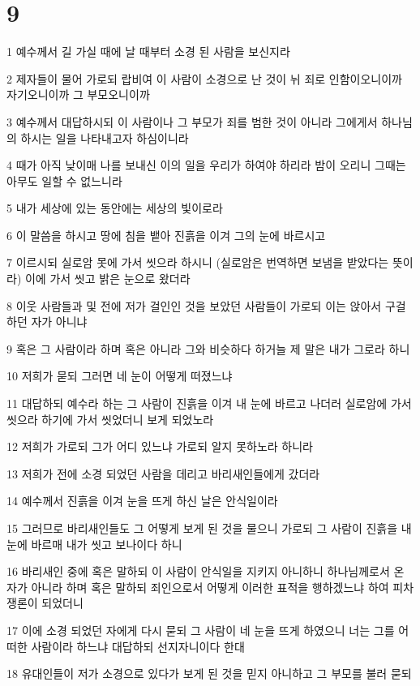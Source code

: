 \chapter{9}

\par 1 예수께서 길 가실 때에 날 때부터 소경 된 사람을 보신지라
\par 2 제자들이 물어 가로되 랍비여 이 사람이 소경으로 난 것이 뉘 죄로 인함이오니이까 자기오니이까 그 부모오니이까
\par 3 예수께서 대답하시되 이 사람이나 그 부모가 죄를 범한 것이 아니라 그에게서 하나님의 하시는 일을 나타내고자 하심이니라
\par 4 때가 아직 낮이매 나를 보내신 이의 일을 우리가 하여야 하리라 밤이 오리니 그때는 아무도 일할 수 없느니라
\par 5 내가 세상에 있는 동안에는 세상의 빛이로라
\par 6 이 말씀을 하시고 땅에 침을 뱉아 진흙을 이겨 그의 눈에 바르시고
\par 7 이르시되 실로암 못에 가서 씻으라 하시니 (실로암은 번역하면 보냄을 받았다는 뜻이라) 이에 가서 씻고 밝은 눈으로 왔더라
\par 8 이웃 사람들과 및 전에 저가 걸인인 것을 보았던 사람들이 가로되 이는 앉아서 구걸하던 자가 아니냐
\par 9 혹은 그 사람이라 하며 혹은 아니라 그와 비슷하다 하거늘 제 말은 내가 그로라 하니
\par 10 저희가 묻되 그러면 네 눈이 어떻게 떠졌느냐
\par 11 대답하되 예수라 하는 그 사람이 진흙을 이겨 내 눈에 바르고 나더러 실로암에 가서 씻으라 하기에 가서 씻었더니 보게 되었노라
\par 12 저희가 가로되 그가 어디 있느냐 가로되 알지 못하노라 하니라
\par 13 저희가 전에 소경 되었던 사람을 데리고 바리새인들에게 갔더라
\par 14 예수께서 진흙을 이겨 눈을 뜨게 하신 날은 안식일이라
\par 15 그러므로 바리새인들도 그 어떻게 보게 된 것을 물으니 가로되 그 사람이 진흙을 내 눈에 바르매 내가 씻고 보나이다 하니
\par 16 바리새인 중에 혹은 말하되 이 사람이 안식일을 지키지 아니하니 하나님께로서 온 자가 아니라 하며 혹은 말하되 죄인으로서 어떻게 이러한 표적을 행하겠느냐 하여 피차 쟁론이 되었더니
\par 17 이에 소경 되었던 자에게 다시 묻되 그 사람이 네 눈을 뜨게 하였으니 너는 그를 어떠한 사람이라 하느냐 대답하되 선지자니이다 한대
\par 18 유대인들이 저가 소경으로 있다가 보게 된 것을 믿지 아니하고 그 부모를 불러 묻되
